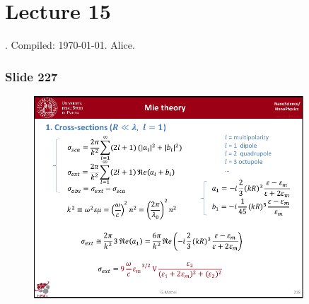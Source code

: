 \documentclass[../main/main.tex]{subfiles}
\begin{document}
\section{Lecture 15}
 . Compiled:  \today. Alice.
 

\subsubsection{Slide 227}

\begin{figure}[h!]
\centering
\includegraphics[page=10,width=0.9\textwidth]{../lessons/pdf_file/14_lesson.pdf}
\end{figure}
\end{document}
